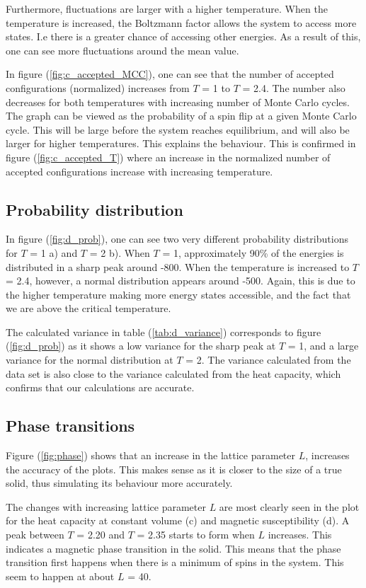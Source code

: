 \documentclass[10pt,a4paper,titlepage]{article}
\begin{document}
Furthermore, fluctuations are larger with a higher temperature. When the temperature is increased, the Boltzmann factor allows the system to access more states. I.e there is a greater chance of accessing other energies. As a result of this, one can see more fluctuations around the mean value.

In figure (\ref{fig:c_accepted_MCC}), one can see that the number of accepted configurations (normalized) increases from $T$ = 1 to $T$ = 2.4. The number also decreases for both temperatures with increasing number of Monte Carlo cycles. The graph can be viewed as the probability of a spin flip at a given Monte Carlo cycle. This will be large before the system reaches equilibrium, and will also be larger for higher temperatures. This explains the behaviour. 
	This is confirmed in figure (\ref{fig:c_accepted_T}) where an increase in the normalized number of accepted configurations increase with increasing temperature. 

\subsection{Probability distribution}
In figure (\ref{fig:d_prob}), one can see two very different probability distributions for $T$ = 1 a) and $T$ = 2 b). When $T$ = 1, approximately 90\% of the energies is distributed in a sharp peak around -800. When the temperature is increased to $T$ = 2.4, however, a normal distribution appears around -500. Again, this is due to the higher temperature making more energy states accessible, and the fact that we are above the critical temperature. 

The calculated variance in table (\ref{tab:d_variance}) corresponds to figure (\ref{fig:d_prob}) as it shows a low variance for the sharp peak at $T$ = 1, and a large variance for the normal distribution at $T$ = 2. The variance calculated from the data set is also close to the variance calculated from the heat capacity, which confirms that our calculations are accurate. 

\subsection{Phase transitions}
Figure (\ref{fig:phase}) shows that an increase in the lattice parameter $L$, increases the accuracy of the plots. This makes sense as it is closer to the size of a true solid, thus simulating its behaviour more accurately. 

The changes with increasing lattice parameter $L$ are most clearly seen in the plot for the heat capacity at constant volume (c) and magnetic susceptibility (d). A peak between $T$ = 2.20 and $T$ = 2.35 starts to form when $L$ increases. This indicates a magnetic phase transition in the solid. This means that the phase transition first happens when there is a minimum of spins in the system. This seem to happen at about $L$ = 40. 
\end{document}
